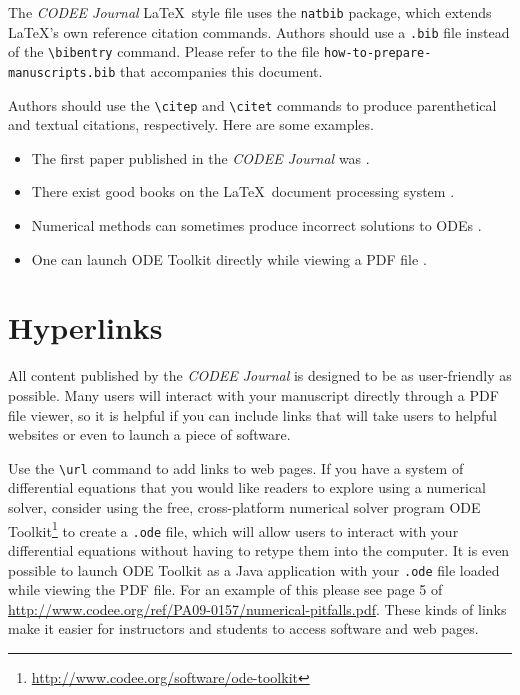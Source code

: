 \documentclass{codee}
\theoremstyle{definition}
\theoremstyle{remark}
\numberwithin{equation}{section}
\begin{document}
The \textit{CODEE Journal} \LaTeX\ style file uses the \texttt{natbib}
package, which extends \LaTeX's own reference citation
commands. Authors should use a \texttt{.bib} file instead of the
\texttt{\textbackslash bibentry} command. Please refer to the file
\texttt{how-to-prepare-manuscripts.bib} that accompanies this
document.

Authors should use the \texttt{\textbackslash citep} and \texttt{\textbackslash citet} commands to produce parenthetical and textual citations, respectively. Here are some examples.

\begin{itemize}
\item The first paper published in the \textit{CODEE Journal} was \citet{borrelli-coleman-2009}.
\item There exist good books on the \LaTeX\ document processing system \citep{gratzer-2004,lamport-1994}.
\item Numerical methods can sometimes produce incorrect solutions to ODEs \citep{borrelli-coleman-2009}.
\item One can launch ODE Toolkit directly while viewing a PDF file \citep[see][page 5]{borrelli-coleman-2009}.
\end{itemize}

\section{Hyperlinks}

All content published by the \textit{CODEE Journal} is designed to be
as user-friendly as possible. Many users will interact with your
manuscript directly through a PDF file viewer, so it is helpful if you
can include links that will take users to helpful websites or even to
launch a piece of software.

Use the \texttt{\textbackslash url} command to add links to web
pages. If you have a system of differential equations that you would
like readers to explore using a numerical solver, consider using the
free, cross-platform numerical solver program ODE
Toolkit\footnote{\url{http://www.codee.org/software/ode-toolkit}} to
create a \texttt{.ode} file, which will allow users to interact with
your differential equations without having to retype them into the
computer. It is even possible to launch ODE Toolkit as a Java
application with your \texttt{.ode} file loaded while viewing the PDF
file.  For an example of this please see page 5 of
\url{http://www.codee.org/ref/PA09-0157/numerical-pitfalls.pdf}. These
kinds of links make it easier for instructors and students to access
software and web pages.
\end{document}
